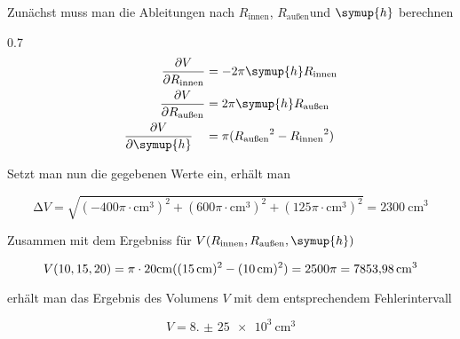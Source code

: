 \begin{flushleft}
Zunächst muss man die Ableitungen nach $R_\text{innen}$, $R_\text{außen}$und $\symup{h}$ berechnen
\end{flushleft}
\begin{spreadlines}{0.7\baselineskip}
\begin{align}
\frac{\partial V}{\partial R_\text{innen}} &= -2\pi \symup{h} R_\text{innen} \\
\frac{\partial V}{\partial R_\text{außen}} &= 2\pi \symup{h} R_\text{außen} \\
\frac{\partial V}{\partial \symup{h}}{~~~} &= \pi ({R_\text{außen}}^2 - {R_\text{innen}}^2) 
\end{align}
\end{spreadlines}
\newpage
\begin{flushleft}
Setzt man nun die gegebenen Werte ein, erhält man
\end{flushleft}
\begin{equation}
\increment V = \sqrt{(-400\pi \cdot \si{\centi\meter}^3)^2 +
                     (600\pi \cdot \si{\centi\meter}^3)^2 +
                     (125\pi \cdot \si{\centi\meter}^3)^2} = \SI{2300}{\centi\meter}^3
\end{equation}
\begin{flushleft}
Zusammen mit dem Ergebniss für $V(R_\text{innen}, R_\text{außen}, \symup{h})$
\end{flushleft}
\begin{equation}
V(10, 15, 20) = \pi \cdot 20 \si{\centi\meter} ((\SI{15}{\centi\meter})^2 - (\SI{10}{\centi\meter})^2) = 2500\pi = \SI{7853{,}98}{\centi\meter}^3
\end{equation}
\begin{flushleft}
erhält man das Ergebnis des Volumens $V$ mit dem entsprechendem Fehlerintervall
\end{flushleft}
\begin{equation}
V = \SI{8.(25)e3}{\centi\meter\tothe{3}}
\end{equation}